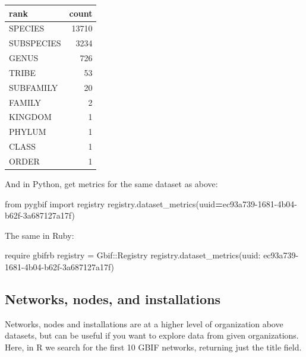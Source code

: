 \documentclass[3p]{elsarticle} %
\newenvironment{Shaded}{\begin{snugshade}}{\end{snugshade}}
\newcommand{\CommentTok}[1]{\textcolor[rgb]{0.56,0.35,0.01}{\textit{#1}}}
\newcommand{\DataTypeTok}[1]{\textcolor[rgb]{0.13,0.29,0.53}{#1}}
\newcommand{\DecValTok}[1]{\textcolor[rgb]{0.00,0.00,0.81}{#1}}
\newcommand{\ImportTok}[1]{#1}
\newcommand{\KeywordTok}[1]{\textcolor[rgb]{0.13,0.29,0.53}{\textbf{#1}}}
\newcommand{\NormalTok}[1]{#1}
\newcommand{\OperatorTok}[1]{\textcolor[rgb]{0.81,0.36,0.00}{\textbf{#1}}}
\newcommand{\StringTok}[1]{\textcolor[rgb]{0.31,0.60,0.02}{#1}}
\begin{document}
\begin{longtable}[]{@{}lr@{}}
\toprule
rank & count\tabularnewline
\midrule
\endhead
SPECIES & 13710\tabularnewline
SUBSPECIES & 3234\tabularnewline
GENUS & 726\tabularnewline
TRIBE & 53\tabularnewline
SUBFAMILY & 20\tabularnewline
FAMILY & 2\tabularnewline
KINGDOM & 1\tabularnewline
PHYLUM & 1\tabularnewline
CLASS & 1\tabularnewline
ORDER & 1\tabularnewline
\bottomrule
\end{longtable}

And in Python, get metrics for the same dataset as above:

\begin{Shaded}
\begin{Highlighting}[]
\ImportTok{from}\NormalTok{ pygbif }\ImportTok{import}\NormalTok{ registry}
\NormalTok{registry.dataset\_metrics(uuid}\OperatorTok{=}\StringTok{\textquotesingle{}ec93a739{-}1681{-}4b04{-}b62f{-}3a687127a17f\textquotesingle{}}\NormalTok{)}
\end{Highlighting}
\end{Shaded}

The same in Ruby:

\begin{Shaded}
\begin{Highlighting}[]
\NormalTok{require }\StringTok{\textquotesingle{}gbifrb\textquotesingle{}}
\NormalTok{registry = }\DataTypeTok{Gbif}\NormalTok{::}\DataTypeTok{Registry}
\NormalTok{registry.dataset\_metrics(}\StringTok{uuid: \textquotesingle{}ec93a739{-}1681{-}4b04{-}b62f{-}3a687127a17f\textquotesingle{}}\NormalTok{)}
\end{Highlighting}
\end{Shaded}

\hypertarget{networks-nodes-and-installations}{%
\subsection{Networks, nodes, and
installations}\label{networks-nodes-and-installations}}

Networks, nodes and installations are at a higher level of organization
above datasets, but can be useful if you want to explore data from given
organizations. Here, in R we search for the first 10 GBIF networks,
returning just the title field.

\begin{Shaded}
\end{Shaded}
\end{document}
